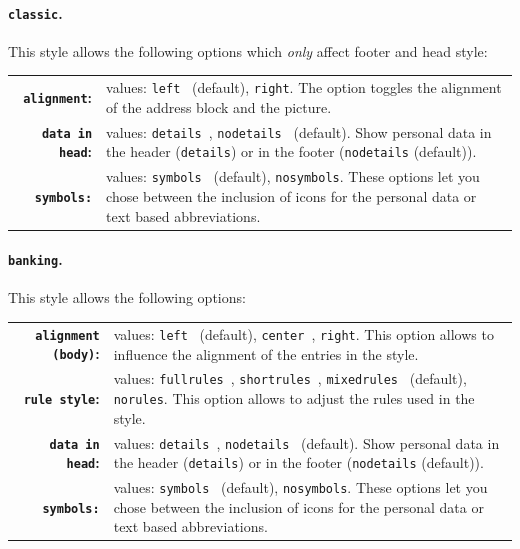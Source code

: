 \documentclass[a4paper,11pt]{article}
\newcommand{\code}[1]{\lstinline!#1!}
\newcommand{\Code}[1]{\lstinline!#1!~} %
\begin{document}
\paragraph{\texttt{classic}.} This style allows the following options which \emph{only} affect footer and head style:\medskip

\begingroup
\renewcommand{\arraystretch}{1.1}
\begin{tabular}{r@{\hspace{2ex}}p{}}
 {\bfseries \code{alignment}:}  & values: \Code{left} (default), \code{right}. The option toggles the alignment of the address block and the picture.  \\
 {\bfseries \code{data in head}:} & values: \Code{details}, \Code{nodetails} (default). Show personal data in the header (\code{details}) or in the footer (\code{nodetails} (default)). \\
 {\bfseries \code{symbols:}}   & values: \Code{symbols} (default), \code{nosymbols}. These options let you chose between the inclusion of icons for the personal data or text based abbreviations.
\end{tabular}\medskip
\endgroup

\paragraph{\texttt{banking}.} This style allows the following options:\medskip

\begingroup
\renewcommand{\arraystretch}{1.1}
\begin{tabular}{r@{\hspace{2ex}}p{}}
  {\bfseries \code{alignment (body)}:}  & values: \Code{left} (default), \Code{center}, \code{right}. This option allows to influence the alignment of the entries in the style.   \\
  {\bfseries \code{rule style}:}  & values: \Code{fullrules}, \Code{shortrules}, \Code{mixedrules} (default), \code{norules}. This option allows to adjust the rules used in the style.   \\
  {\bfseries \code{data in head}:} & values: \Code{details}, \Code{nodetails} (default). Show personal data in the header (\code{details}) or in the footer (\code{nodetails} (default)). \\
 {\bfseries \code{symbols:}}   & values: \Code{symbols} (default), \code{nosymbols}. These options let you chose between the inclusion of icons for the personal data or text based abbreviations.
\end{tabular}\medskip
\endgroup
\end{document}
